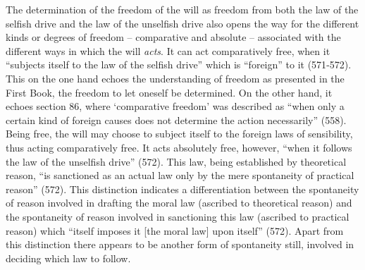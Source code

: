 The determination of the freedom of the will as freedom from both the law of the selfish drive and the law of the unselfish drive also opens the way for the different kinds or degrees of freedom {--} comparative and absolute {--} associated with the different ways in which the will \textit{acts}. It can act comparatively free, when it ``subjects itself to the law of the selfish drive'' which is ``foreign'' to it (571{-}572). This on the one hand echoes the understanding of freedom as presented in the First Book, the freedom to let oneself be determined. On the other hand, it echoes section 86, where `comparative freedom' was described as ``when only a certain kind of foreign causes does not determine the action necessarily'' (558). Being free, the will may choose to subject itself to the foreign laws of sensibility, thus acting comparatively free. It acts absolutely free, however, ``when it follows the law of the unselfish drive'' (572). This law, being established by theoretical reason, ``is sanctioned as an actual law only by the mere spontaneity of practical reason'' (572). This distinction indicates a differentiation between the spontaneity of reason involved in drafting the moral law (ascribed to theoretical reason) and the spontaneity of reason involved in sanctioning this law (ascribed to practical reason) which ``itself imposes it [the moral law] upon itself'' (572). Apart from this distinction there appears to be another form of spontaneity still, involved in deciding which law to follow. 


